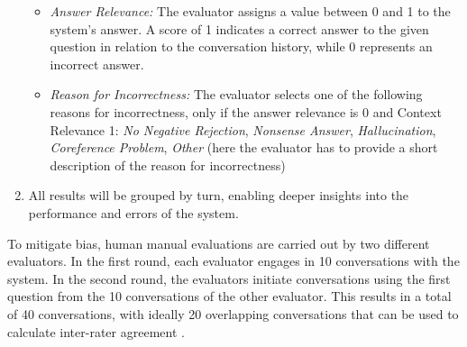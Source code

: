 \begin{enumerate}
\begin{itemize}
            \item \textit{Answer Relevance:} The evaluator assigns a value between 0 and 1 to the system's answer. A score of 1 indicates a correct answer to the given question in relation to the conversation history, while 0 represents an incorrect answer.
            \item \textit{Reason for Incorrectness:} The evaluator selects one of the following reasons for incorrectness, only if the answer relevance is 0 and Context Relevance 1: \textit{No Negative Rejection}, \textit{Nonsense Answer}, \textit{Hallucination}, \textit{Coreference Problem}, \textit{Other} (here the evaluator has to provide a short description of the reason for incorrectness) 
        \end{itemize}
    \item All results will be grouped by turn, enabling deeper insights into the performance and errors of the system.
\end{enumerate}

To mitigate bias, human manual evaluations are carried out by two different evaluators. In the first round, each evaluator engages in 10 conversations with the system. In the second round, the evaluators initiate conversations using the first question from the 10 conversations of the other evaluator. This results in a total of 40 conversations, with ideally 20 overlapping conversations that can be used to calculate inter-rater agreement \cite{cohen_coefficient_1960}.
    


